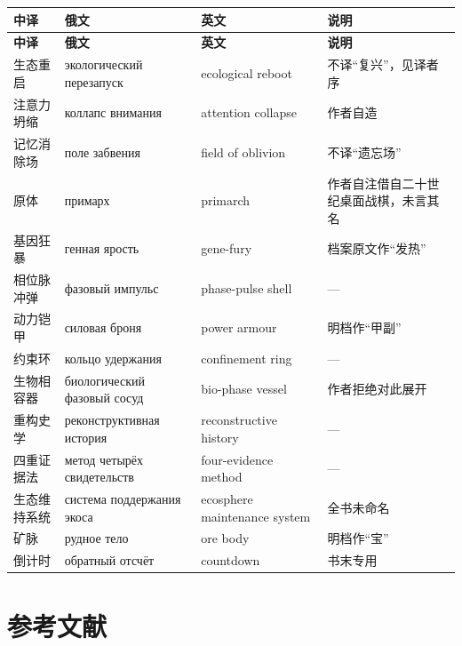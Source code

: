 \vspace{4mm}
{\footnotesize
\renewcommand{\arraystretch}{1.24}
\begin{longtable}{@{}p{23mm}p{34mm}p{36mm}p{34mm}@{}}
\toprule
\textbf{中译} & \textbf{俄文} & \textbf{英文} & \textbf{说明}\\
\midrule
\endfirsthead
\toprule
\textbf{中译} & \textbf{俄文} & \textbf{英文} & \textbf{说明}\\
\midrule
\endhead
\bottomrule
\endfoot
生态重启 & экологический перезапуск & ecological reboot & 不译“复兴”，见译者序\\
注意力坍缩 & коллапс внимания & attention collapse & 作者自造\\
记忆消除场 & поле забвения & field of oblivion & 不译“遗忘场”\\
原体 & примарх & primarch & 作者自注借自二十世纪桌面战棋，未言其名\\
基因狂暴 & генная ярость & gene-fury & 档案原文作“发热”\\
相位脉冲弹 & фазовый импульс & phase-pulse shell & —\\
动力铠甲 & силовая броня & power armour & 明档作“甲副”\\
约束环 & кольцо удержания & confinement ring & —\\
生物相容器 & биологический фазовый сосуд & bio-phase vessel & 作者拒绝对此展开\\
重构史学 & реконструктивная история & reconstructive history & —\\
四重证据法 & метод четырёх свидетельств & four-evidence method & —\\
生态维持系统 & система поддержания экоса & ecosphere maintenance system & 全书未命名\\
矿脉 & рудное тело & ore body & 明档作“宝”\\
倒计时 & обратный отсчёт & countdown & 书末专用\\
\bottomrule
\end{longtable}
}

\clearpage
\chapter*{参考文献}

\begingroup
\footnotesize
\linespread{1.25}\selectfont
\setlength{\parindent}{0pt}
\setlength{\parskip}{1.6pt}


